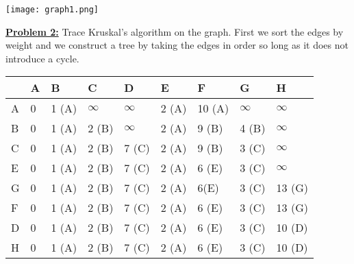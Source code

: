 \documentclass[11pt]{article}
\begin{document}
\begin{flushleft}
	\texttt{[image: graph1.png]}
	\newpage
	\item\textbf{\underline{Problem 2:}} Trace Kruskal's algorithm on the graph.
	\newline
	First we sort the edges by weight and we construct a tree by taking the edges in order so long as it does not introduce a cycle. 
	\newline
	\begin{tabular}{ | p{1cm} | p{1.2cm} | p{1.2cm} | p{1.2cm} | p{1.2cm} | p{1.2cm} | p{1.2cm} | p{1.2cm} | p{1.2cm} | }
		\hline
		$ $ & A & B & C & D & E & F & G & H\\ 
		
		\hline
		A & 0 & 1 (A) & $\infty$ & $\infty$ & 2 (A) & 10 (A) & $\infty$ & $\infty$ \\
		
		\hline
		B & 0 & 1 (A) & 2 (B) & $\infty$ & 2 (A) & 9 (B) & 4 (B) & $\infty$ \\
		
		\hline
		C & 0 & 1 (A) & 2 (B) & 7 (C) & 2 (A) & 9 (B) & 3 (C) & $\infty$ \\
		
		\hline
		E & 0 & 1 (A) & 2 (B) & 7 (C) & 2 (A) & 6 (E) & 3 (C) & $\infty$ \\
		
		\hline
		G & 0 & 1 (A) & 2 (B) & 7 (C) & 2 (A) & 6(E) & 3 (C) & 13 (G)\\
		
		\hline
		F & 0 & 1 (A) & 2 (B) & 7 (C) & 2 (A) & 6 (E) & 3 (C) & 13 (G)\\
		
		\hline
		D & 0 & 1 (A) & 2 (B) & 7 (C) & 2 (A) & 6 (E) & 3 (C) & 10 (D)\\
		
		\hline
		H & 0 & 1 (A) & 2 (B) & 7 (C) & 2 (A) & 6 (E) & 3 (C) & 10 (D)\\
		\hline
	\end{tabular}

	

\end{flushleft}
\end{document}
